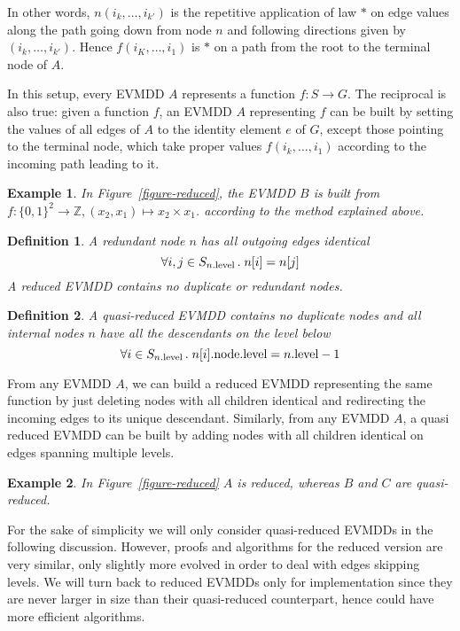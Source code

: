 \documentclass[nocover]             %
{NASA}                       %
\newcommand{\Z}{\mathbb{Z}}
\newtheorem{mydefinition}{Definition}[section]
\newtheorem{myexample}{Example}[section]
\newcommand{\node}[1]{#1{\rm .node}}
\newcommand{\level}[1]{#1{\rm .level}}
\begin{document}
In other words, $n(i_k,\ldots, i_{k'})$ is the repetitive application of law $*$
on edge values along the path going down from node $n$ and following directions
given by $(i_k,\ldots, i_{k'})$. Hence $f(i_K,\ldots, i_1)$ is $*$ on a path from
the root to the terminal node of $A$.

In this setup, every EVMDD $A$ represents a function $f:S\rightarrow G$.
The reciprocal is also true: given a function $f$, an EVMDD $A$ representing
$f$ can be built by setting the values of all edges of $A$ to the identity element $e$
of $G$, except those pointing to the terminal node, which take proper values
$f(i_k,\ldots, i_1)$ according to the incoming path leading to it.

\begin{myexample}
In Figure~\vref{figure-reduced}, the EVMDD $B$ is built
from $f:\{0, 1\}^2\rightarrow\Z, (x_2, x_1)\mapsto x_2\times x_1$. according to the method explained above.
\end{myexample}

\begin{mydefinition}\label{definition-reduced}
A redundant node $n$ has all outgoing edges identical
$$
\forall i, j \in S_{\level{n}}\,.\; n[i] = n[j]
$$
A \emph{reduced} EVMDD contains no duplicate or redundant nodes.
\end{mydefinition}

\begin{mydefinition}\label{definition-quasi-reduced}
A \emph{quasi-reduced} EVMDD contains no duplicate nodes and all internal nodes $n$ 
have all the descendants on the level below
$$
\forall i \in S_{\level{n}}\,.\; \level{\node{n[i]}} = \level{n}-1
$$
\end{mydefinition}

From any EVMDD $A$, we can build a reduced EVMDD representing the same function
by just deleting nodes with all children identical and redirecting the incoming edges to its unique descendant.
Similarly, from any EVMDD $A$, a quasi reduced EVMDD can be built by adding
nodes with all children identical on edges spanning multiple levels.

\begin{myexample}
In Figure~\vref{figure-reduced} $A$ is reduced, whereas $B$ and $C$ are quasi-reduced.
\end{myexample}

For the sake of simplicity we will only consider quasi-reduced EVMDDs in the following discussion. However, proofs and algorithms for the reduced version are very similar, only slightly more evolved in order to deal with edges skipping levels. We will turn back to reduced EVMDDs only for implementation since they are never larger in size than their quasi-reduced counterpart, hence could have more efficient algorithms.
\end{document}
